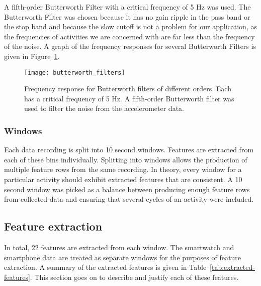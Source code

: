         A fifth-order Butterworth Filter with a critical frequency of 5 \si{Hz} was used. The Butterworth Filter was chosen because it has no gain ripple in the pass band or the stop band and because the slow cutoff is not a problem for our application, as the frequencies of activities we are concerned with are far less than the frequency of the noise. A graph of the frequency responses for several Butterworth Filters is given in Figure~\ref{fig:butterworth_filters}.
        
        \begin{figure}
          \centering
          \texttt{[image: butterworth\_filters]}
          \caption{Frequency response for Butterworth filters of different orders. Each has a critical frequency of 5 \si{Hz}. A fifth-order Butterworth filter was used to filter the noise from the accelerometer data.}
          \label{fig:butterworth_filters}
        \end{figure}
        
      \subsubsection{Windows}
        Each data recording is split into 10 second windows. Features are extracted from each of these bins individually. Splitting into windows allows the production of multiple feature rows from the same recording. In theory, every window for a particular activity should exhibit extracted features that are consistent. A 10 second window was picked as a balance between producing enough feature rows from collected data and ensuring that several cycles of an activity were included. 
      
    \subsection{Feature extraction}
      In total, 22 features are extracted from each window. The smartwatch and smartphone data are treated as separate windows for the purposes of feature extraction. A summary of the extracted features is given in Table~\ref{tab:extracted-features}. This section goes on to describe and justify each of these features.
      
